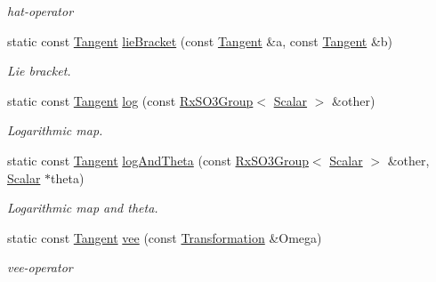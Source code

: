 \begin{DoxyCompactItemize}
\begin{DoxyCompactList}\small\item\em hat-\/operator \end{DoxyCompactList}\item 
static const \hyperlink{class_sophus_1_1_rx_s_o3_group_base_aa1c4034b0a69496b28f1e81fdc7510c5}{Tangent} \hyperlink{class_sophus_1_1_rx_s_o3_group_base_a46710014c6234b7e4a6239dc985b2a6b}{lie\+Bracket} (const \hyperlink{class_sophus_1_1_rx_s_o3_group_base_aa1c4034b0a69496b28f1e81fdc7510c5}{Tangent} \&a, const \hyperlink{class_sophus_1_1_rx_s_o3_group_base_aa1c4034b0a69496b28f1e81fdc7510c5}{Tangent} \&b)
\begin{DoxyCompactList}\small\item\em Lie bracket. \end{DoxyCompactList}\item 
static const \hyperlink{class_sophus_1_1_rx_s_o3_group_base_aa1c4034b0a69496b28f1e81fdc7510c5}{Tangent} \hyperlink{class_sophus_1_1_rx_s_o3_group_base_ad6fa243f3fb9ca940f87dccae4b8e8d8}{log} (const \hyperlink{class_sophus_1_1_rx_s_o3_group}{Rx\+S\+O3\+Group}$<$ \hyperlink{class_sophus_1_1_rx_s_o3_group_base_af4006e7d95216a7e50823a1cd9c9e265}{Scalar} $>$ \&other)
\begin{DoxyCompactList}\small\item\em Logarithmic map. \end{DoxyCompactList}\item 
static const \hyperlink{class_sophus_1_1_rx_s_o3_group_base_aa1c4034b0a69496b28f1e81fdc7510c5}{Tangent} \hyperlink{class_sophus_1_1_rx_s_o3_group_base_a75f2cac71d286305b4e175db01b5bfc9}{log\+And\+Theta} (const \hyperlink{class_sophus_1_1_rx_s_o3_group}{Rx\+S\+O3\+Group}$<$ \hyperlink{class_sophus_1_1_rx_s_o3_group_base_af4006e7d95216a7e50823a1cd9c9e265}{Scalar} $>$ \&other, \hyperlink{class_sophus_1_1_rx_s_o3_group_base_af4006e7d95216a7e50823a1cd9c9e265}{Scalar} $\ast$theta)
\begin{DoxyCompactList}\small\item\em Logarithmic map and theta. \end{DoxyCompactList}\item 
static const \hyperlink{class_sophus_1_1_rx_s_o3_group_base_aa1c4034b0a69496b28f1e81fdc7510c5}{Tangent} \hyperlink{class_sophus_1_1_rx_s_o3_group_base_ab4f9270e3f4588bb1d848604b848a9fe}{vee} (const \hyperlink{class_sophus_1_1_rx_s_o3_group_base_a60b2d8cd20692d3d39e5e7c729d95145}{Transformation} \&Omega)
\begin{DoxyCompactList}\small\item\em vee-\/operator \end{DoxyCompactList}\end{DoxyCompactItemize}
